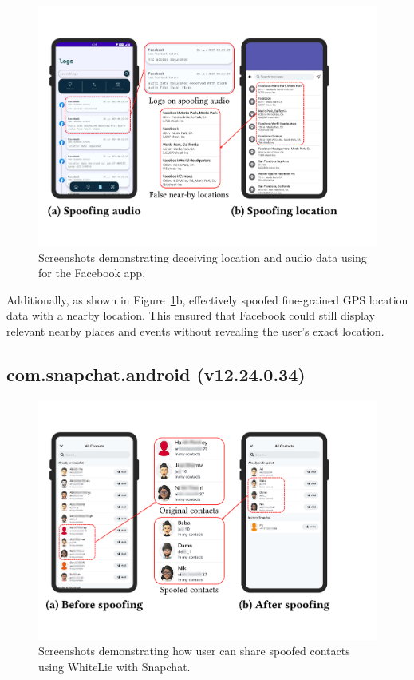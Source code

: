 \begin{figure}[t]
    \centering
    \includegraphics[width=0.75\linewidth]{Figures/Case Studies/facebook_screenshots.pdf}
    \caption{Screenshots demonstrating deceiving location and audio data using \framework{} for the Facebook app.}
    \label{fig:case-study-facebook}
\end{figure}

Additionally, as shown in Figure~\ref{fig:case-study-facebook}b, \framework{} effectively spoofed fine-grained GPS location data with a nearby location. This ensured that Facebook could still display relevant nearby places and events without revealing the user’s exact location.

\subsection{com.snapchat.android (v12.24.0.34)}
\label{sec:sc_case_study}

\begin{figure}[t]
    \centering
    \includegraphics[width=0.75\linewidth]{Figures/Case Studies/snapchat_screenshots.pdf}
    \caption{Screenshots demonstrating how user can share spoofed contacts using WhiteLie with Snapchat.}
    \label{fig:case-study-snapchat}
\end{figure}

